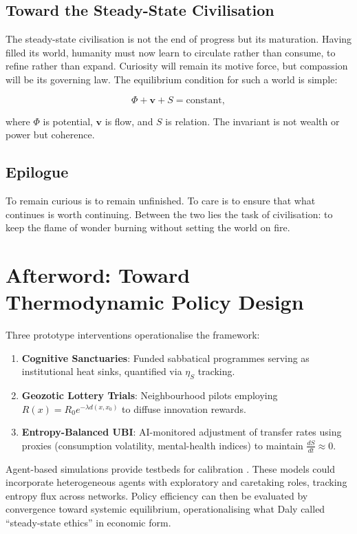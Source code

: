 \documentclass[12pt,a4paper]{article}
\begin{document}
\subsection{Toward the Steady-State Civilisation}

The steady-state civilisation is not the end of progress but its maturation.
Having filled its world, humanity must now learn to circulate rather than consume,
to refine rather than expand.
Curiosity will remain its motive force,
but compassion will be its governing law.
The equilibrium condition for such a world is simple:

\[
\Phi + \mathbf{v} + S = \mathrm{constant},
\]

where $\Phi$ is potential, $\mathbf{v}$ is flow, and $S$ is relation.
The invariant is not wealth or power but coherence.

\subsection*{Epilogue}

To remain curious is to remain unfinished.  
To care is to ensure that what continues is worth continuing.  
Between the two lies the task of civilisation:  
to keep the flame of wonder burning  
without setting the world on fire.

\section*{Afterword: Toward Thermodynamic Policy Design}

Three prototype interventions operationalise the framework:

\begin{enumerate}
\item \textbf{Cognitive Sanctuaries}: Funded sabbatical programmes 
serving as institutional heat sinks, 
quantified via \(\eta_S\) tracking.
\item \textbf{Geozotic Lottery Trials}: Neighbourhood pilots 
employing \(R(x) = R_0 e^{-\lambda d(x,x_0)}\) 
to diffuse innovation rewards.
\item \textbf{Entropy-Balanced UBI}: AI-monitored adjustment 
of transfer rates using proxies 
(consumption volatility, mental-health indices) 
to maintain \(\frac{dS}{dt} \approx 0\).
\end{enumerate}

Agent-based simulations provide testbeds for calibration 
\citep{foster2023agent}. These models could incorporate heterogeneous agents 
with exploratory and caretaking roles, tracking entropy flux across networks. 
Policy efficiency can then be evaluated by convergence toward systemic equilibrium, 
operationalising what Daly called ``steady-state ethics'' in economic form.
\end{document}
